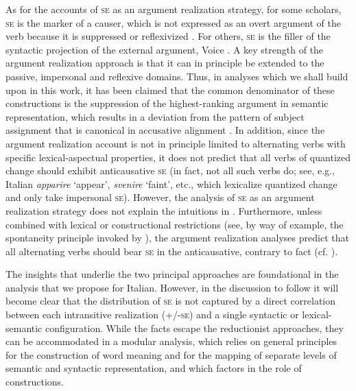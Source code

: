 \documentclass[output=paper,colorlinks,citecolor=brown
]{langscibook}
\begin{document}
As for the accounts of \textsc{se} as an argument realization strategy, for some scholars, \textsc{se} is the marker of a causer, which is not expressed as an overt argument of the verb because it is suppressed or reflexivized \citep{rothemerg1974verbes,vanvalin1990semantic,labelle1992change,cennamo1995patterns,centineo1995distribution,bentley2006split,koontz2009anticausativization}. For others, \textsc{se} is the filler of the syntactic projection of the external argument, Voice \citep{alexiadou2006properties,alexiadou2015external}. A key strength of the argument realization approach is that it can in principle be extended to the passive, impersonal and reflexive domains. Thus, in analyses which we shall build upon in this work, it has been claimed that the common denominator of these constructions is the suppression of the highest-ranking argument in semantic representation, which results in a deviation from the pattern of subject assignment that is canonical in accusative alignment \citep{vanvalin1990semantic,centineo1995distribution,bentley2006split,bentley2023internally,gonzales2006construcciones}. In addition, since the argument realization account is not in principle limited to alternating verbs with specific lexical-aspectual properties, it does not predict that all verbs of quantized change should exhibit anticausative \textsc{se} (in fact, not all such verbs do; see, e.g., Italian \textit{apparire} ‘appear’, \textit{svenire} ‘faint’, etc., which lexicalize quantized change and only take impersonal \textsc{se}). However, the analysis of \textsc{se} as an argument realization strategy does not explain the intuitions in . Furthermore, unless combined with lexical or constructional restrictions (see, by way of example, the spontaneity principle invoked by \cite[96, 114—120]{alexiadou2015external}), the argument realization analyses predict that all alternating verbs should bear \textsc{se} in the anticausative, contrary to fact (cf. ). 

The insights that underlie the two principal approaches are foundational in the analysis that we propose for Italian. However, in the discussion to follow it will become clear that the distribution of \textsc{se} is not captured by a direct correlation between each intransitive realization (+/-\textsc{se}) and a single syntactic or lexical-semantic configuration. While the facts escape the reductionist approaches, they can be accommodated in a modular analysis, which relies on general principles for the construction of word meaning and for the mapping of separate levels of semantic and syntactic representation, and which factors in the role of constructions. 
\end{document}

